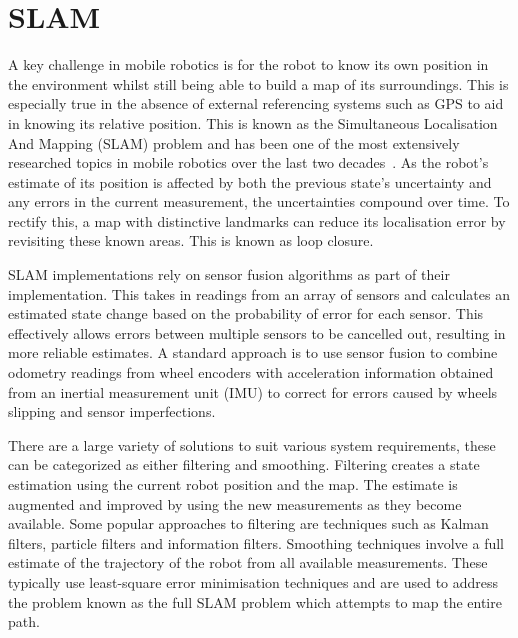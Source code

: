 \section{SLAM}\label{litreview/slam}
A key challenge in mobile robotics is for the robot to know its own position in the
environment whilst still being able to build a map of its surroundings. 
This is especially true in the absence of external referencing systems
such as GPS to aid in knowing its relative position. This is known as the Simultaneous Localisation And Mapping (SLAM)
problem and has been one of the most extensively researched topics in mobile
robotics over the last two decades~\cite{grisetti2010tutorial}. As the robot's
estimate of its position is affected by both the previous state's uncertainty
and any errors in the current measurement, the uncertainties compound
over time. To rectify this, a map with distinctive landmarks can reduce its
localisation error by revisiting these known areas. This is known as loop closure.

SLAM implementations rely on sensor fusion algorithms as part of their implementation. 
This takes in readings from an array of sensors and calculates an estimated state change
based on the probability of error for each sensor. This effectively allows errors between 
multiple sensors to be cancelled out, resulting in more reliable estimates. A standard 
approach is to use sensor fusion to combine odometry readings from wheel encoders with 
acceleration information obtained from an inertial measurement unit (IMU) to correct for 
errors caused by wheels slipping and sensor imperfections.

There are a large variety of solutions to suit various system requirements, these
can be categorized as either filtering and smoothing. Filtering creates a state estimation 
using the current robot position and the map. The estimate is augmented and improved
by using the new measurements as they become available. Some popular
approaches to filtering are techniques such as Kalman filters, particle filters
and information filters. Smoothing techniques involve a full estimate of the trajectory of
the robot from all available measurements. These typically use least-square error 
minimisation techniques and are used to address the problem known as the full SLAM 
problem which attempts to map the entire path.

